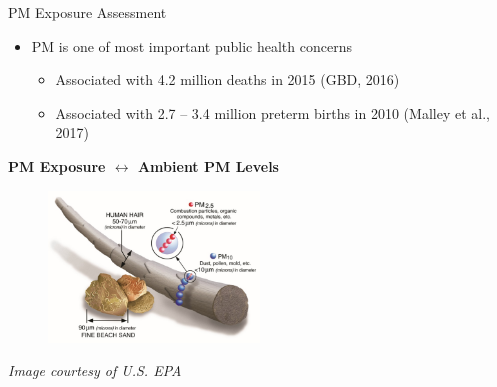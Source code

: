 \begin{frame}{PM Exposure Assessment}
\begin{itemize}
    \item PM is one of most important public health concerns 
    \begin{itemize}
        \item Associated with 4.2 million deaths in 2015 (GBD, 2016) 
        \item Associated with 2.7 -- 3.4 million preterm births in 2010 (Malley et al., 2017)
    \end{itemize}
\end{itemize}
\begin{center}
    \bf \color{red} PM Exposure $\leftrightarrow$ Ambient PM Levels
\end{center}
\begin{figure}
    \centering
    \includegraphics[width=0.5\textwidth]{img/pm25.png}
    \label{fig:pm25}
\end{figure}
\vspace{-0.4cm}
\begin{center}
    \textit{\tiny Image courtesy of U.S. EPA}
\end{center}
\end{frame}

